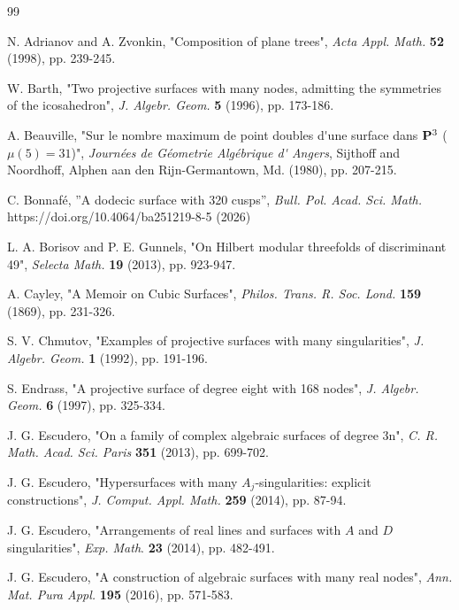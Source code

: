\documentclass{birkjour_t2}
\theoremstyle{definition}
\theoremstyle{remark}
\numberwithin{equation}{section}
\begin{document}
 \begin{thebibliography}{99}
 \bigskip\par  
 
  N. Adrianov  and A. Zvonkin, "Composition of plane trees",  {\it Acta Appl. Math.} {\bf 52}  (1998), pp. 239-245.
\par   
    W. Barth,  "Two projective surfaces with many nodes, admitting the symmetries of the icosahedron", {\it J. Algebr. Geom.  } {\bf 5}  (1996), pp. 173-186.
    \par 
      A. Beauville,  "Sur le nombre maximum de point doubles d\'{}une surface dans ${\bf{P}}^{3}$ ($\mu(5)=31$)", {\it Journ\'{e}es de G\'{e}ometrie Alg\'{e}brique d\'{} Angers}, Sijthoff and Noordhoff, Alphen aan den Rijn-Germantown, Md.  (1980), pp. 207-215.
  \par 
{} C. Bonnafé, ”A dodecic surface with 320 cusps”, {\it Bull. Pol. Acad. Sci. Math.}  https://doi.org/10.4064/ba251219-8-5 (2026)
  \par 
    L. A. Borisov and P. E. Gunnels,  "On Hilbert modular threefolds of discriminant 49", {\it Selecta Math.  } {\bf 19}  (2013), pp. 923-947.
\par   
   A. Cayley, "A Memoir on Cubic Surfaces",  {\it Philos. Trans. R. Soc. Lond.} {\bf 159} (1869), pp. 231-326.
\par   
    S. V. Chmutov,  "Examples of projective surfaces with many singularities", {\it J. Algebr. Geom.}  {\bf 1} (1992), pp. 191-196. 
 \par  
    S. Endrass,  "A projective surface of degree eight with 168 nodes", {\it  J. Algebr. Geom.} {\bf 6} (1997), pp. 325-334.
\par  
  J. G. Escudero, "On a family of complex algebraic surfaces of degree 3n",  {\it C. R. Math. Acad. Sci. Paris} {\bf 351} (2013), pp. 699-702.
 \par  
  J. G. Escudero, "Hypersurfaces with many $A_{j}$-singularities: explicit constructions", {\it J. Comput. Appl. Math.} \textbf{259} (2014), pp. 87-94.
  \par 
{} J. G. Escudero, "Arrangements of real lines and surfaces with $A$ and $D$ singularities", {\it Exp. Math}. \textbf{23} (2014), pp. 482-491.
\par 
{} J. G. Escudero,  "A construction of algebraic surfaces with many real nodes",  {\it  Ann. Mat. Pura Appl.} \textbf{195} (2016), pp. 571-583.

\end{thebibliography}
\end{document}
